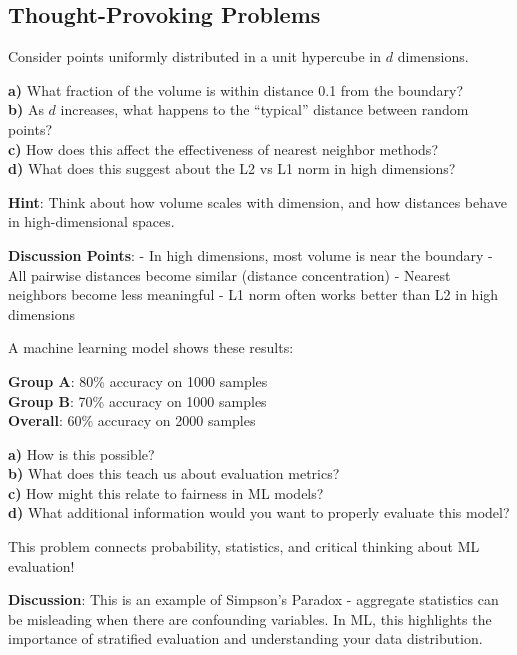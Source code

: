 \documentclass{article}
\newcounter{example}
\newcounter{exercise}
\begin{document}
\subsection{Thought-Provoking Problems}

\begin{tcolorbox}[colback=gray!5!white,colframe=gray!75!black,title=Problem \stepcounter{exercise}\#\theexercise: The Curse of Dimensionality]
Consider points uniformly distributed in a unit hypercube in $d$ dimensions.

\textbf{a)} What fraction of the volume is within distance 0.1 from the boundary?\\
\textbf{b)} As $d$ increases, what happens to the ``typical'' distance between random points?\\
\textbf{c)} How does this affect the effectiveness of nearest neighbor methods?\\
\textbf{d)} What does this suggest about the L2 vs L1 norm in high dimensions?

\textbf{Hint}: Think about how volume scales with dimension, and how distances behave in high-dimensional spaces.

\textbf{Discussion Points}:
- In high dimensions, most volume is near the boundary
- All pairwise distances become similar (distance concentration)
- Nearest neighbors become less meaningful
- L1 norm often works better than L2 in high dimensions
\end{tcolorbox}

\begin{tcolorbox}[colback=gray!5!white,colframe=gray!75!black,title=Problem \stepcounter{exercise}\#\theexercise: Simpson's Paradox in ML]
A machine learning model shows these results:

\textbf{Group A}: 80\% accuracy on 1000 samples\\
\textbf{Group B}: 70\% accuracy on 1000 samples\\
\textbf{Overall}: 60\% accuracy on 2000 samples

\textbf{a)} How is this possible?\\
\textbf{b)} What does this teach us about evaluation metrics?\\
\textbf{c)} How might this relate to fairness in ML models?\\
\textbf{d)} What additional information would you want to properly evaluate this model?

This problem connects probability, statistics, and critical thinking about ML evaluation!

\textbf{Discussion}:
This is an example of Simpson's Paradox - aggregate statistics can be misleading when there are confounding variables. In ML, this highlights the importance of stratified evaluation and understanding your data distribution.
\end{tcolorbox}
\end{document}
